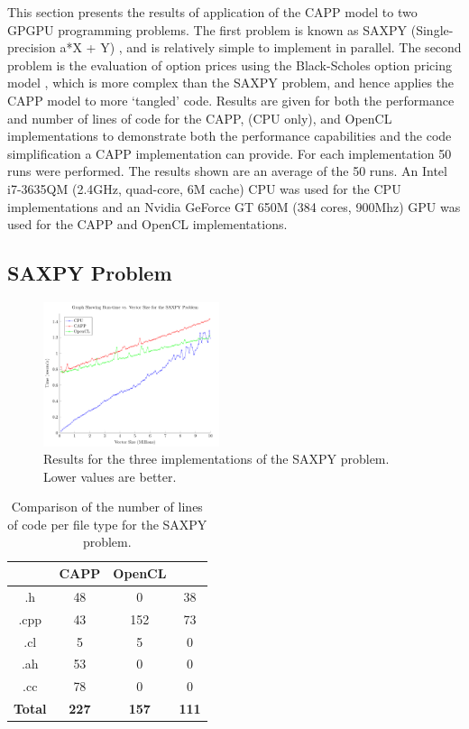 \documentclass{sig-alternate-05-2015}
\begin{document}
This section presents the results of application of the CAPP model to two
GPGPU programming problems. The first problem is known as SAXPY
(Single-precision a*X + Y) \cite{harris:saxpy}, and is relatively 
simple to implement in parallel. The second problem is the evaluation of option 
prices using the Black-Scholes option pricing model \cite{gems:blackscholes},
which is more complex than the SAXPY problem, and hence applies the CAPP model 
to more `tangled' \CPP code. Results are given for both the performance and
number of lines of code for the CAPP, \CPP (CPU only), and OpenCL
implementations to demonstrate both the performance capabilities and the code
simplification a CAPP implementation can provide. For each implementation 50
runs were performed. The results shown are an average of the 50 runs. An Intel 
i7-3635QM (2.4GHz, quad-core, 6M cache) CPU was used for the CPU
implementations and an Nvidia GeForce GT 650M (384 cores, 900Mhz) GPU was used for
the CAPP and OpenCL implementations.

\subsection{SAXPY Problem}


\begin{figure}[!t]
	\centering
	\includegraphics[width=0.46\textwidth]{Saxpy}
	\caption{Results for the three implementations of the SAXPY problem. Lower
	values are better.}
	\label{fig:saxpy}
\end{figure}

\begin{table}[!b]
\centering
\caption{Comparison of the number of lines of code per file type for the SAXPY
problem.}
\label{tab:saxpy}
\begin{tabular}{|c|c|c|c|} 
	\hline
				& CAPP			& OpenCL		& \CPP	\\ \hline
.h				& 48			& 0				& 38	\\ \hline
.cpp			& 43			& 152			& 73	\\ \hline
.cl				& 5				& 5				& 0		\\ \hline
.ah				& 53			& 0				& 0		\\ \hline
.cc				& 78			& 0				& 0		\\ \hline
\textbf{Total}	& \textbf{227}	& \textbf{157}	& \textbf{111}		\\ \hline		
\hline
\end{tabular}
\end{table}
\end{document}
